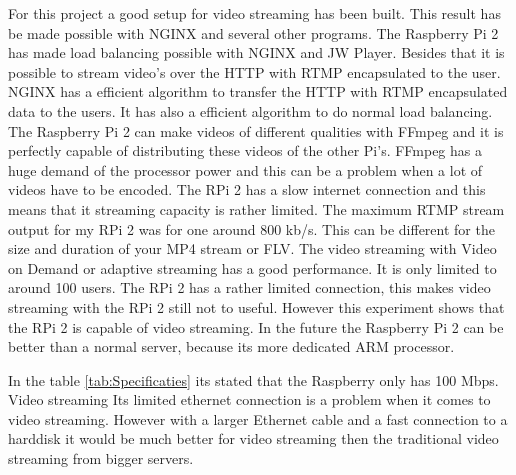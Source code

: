 \documentclass{sig-alternate-br}
\begin{document}
For this project a good setup for video streaming has been built. This result has be made possible with NGINX and several other programs. The Raspberry Pi 2 has made load balancing possible with NGINX and JW Player. Besides that it is possible to stream video's over the HTTP with RTMP encapsulated to the user. NGINX has a efficient algorithm to transfer the HTTP with RTMP encapsulated data to the users. It has also a efficient algorithm to do normal load balancing. \newline
The Raspberry Pi 2 can make videos of different qualities with FFmpeg and it is perfectly capable of distributing these videos of the other Pi's. FFmpeg has a huge demand of the processor power and this can be a problem when a lot of videos have to be encoded. 
The RPi 2 has a slow internet connection and this means that it streaming capacity is rather limited.  The maximum RTMP stream output for my RPi 2 was for one around 800 kb/s. This can be different for the size and duration of your MP4 stream or FLV. The video streaming with Video on Demand or adaptive streaming has a good performance. It is only limited to around 100 users. The RPi 2 has a rather limited connection, this makes video streaming with the RPi 2 still not to useful. However this experiment shows that the RPi 2 is capable of video streaming. In the future the Raspberry Pi 2 can be better than a normal server, because its more dedicated ARM processor. 


In the table \ref{tab:Specificaties} its stated that the Raspberry only has 100 Mbps. Video streaming Its limited ethernet connection is a problem when it comes to video streaming. However with a larger Ethernet cable and a fast connection to a harddisk it would be much better for video streaming then the traditional video streaming from bigger servers.  
\end{document}
